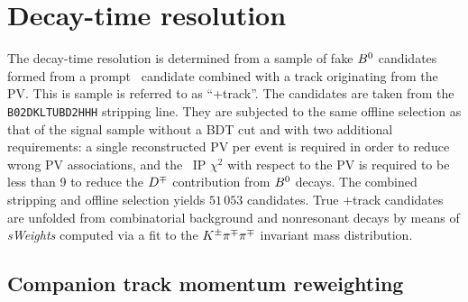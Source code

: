 \section{Decay-time resolution}
\label{sec:time:resol}

The decay-time resolution is determined from a sample of fake $B^0$ candidates formed from a prompt \Dmp~candidate combined with a track originating from the PV. This is sample is referred to as ``\Dmp+track''. The candidates are taken from the \texttt{B02DKLTUBD2HHH} stripping line. They are subjected to the same offline selection as that of the signal sample without a BDT cut and with two additional requirements: a single reconstructed PV per event is required in order to reduce wrong PV associations, and the \Dmp~IP $\chi^{2}$ with respect to the PV is required to be less than 9 to reduce the $D^\mp$ contribution from $B^0$ decays. The combined stripping and offline selection yields $51\,053$ candidates. True \Dmp+track candidates are unfolded from combinatorial background and nonresonant decays by means of \emph{sWeights} computed via a fit to the $K^\pm\pi^\mp\pi^\mp$ invariant mass distribution.

\subsection{Companion track momentum reweighting}

